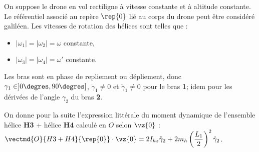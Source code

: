 \begin{hypo}
On suppose le drone en vol rectiligne à vitesse constante et à altitude constante. Le référentiel associé au repère $\rep{0}$ lié au corps du drone peut être considéré galiléen.
Les vitesses de rotation des hélices sont telles que :
\begin{itemize}
\item $|\omega_1|=|\omega_2|=\omega$ constante,
\item $|\omega_3|=|\omega_4|=\omega'$ constante.
\end{itemize}
Les bras sont en phase de repliement ou dépliement, 
donc $\gamma_1 \in ]0\degres, 90\degres]$, 
$\dot{\gamma}_1 \neq 0$ et  $\ddot{\gamma}_1 \neq 0$ pour le bras \textbf{1};
idem pour les dérivées de l’angle $\gamma_2$ du bras \textbf{2}.
\end{hypo}



\ifprof
\begin{corrige}
\end{corrige}
\else
\fi


\ifprof
\begin{corrige}
\end{corrige}
\else
\fi


\ifprof
\begin{corrige}
\end{corrige}
\else
\fi


On donne pour la suite l’expression littérale du moment dynamique de l’ensemble hélice \textbf{H3}
+ hélice \textbf{H4} calculé en $O$ selon $\vz{0}$ : $\vectmd{O}{H3+H4}{\rep{0}} \cdot \vz{0} = 2 I_{hz} \ddot{\gamma}_2 + 2m_h \left(\dfrac{L_1}{2}\right)^2 \ddot{\gamma}_2$.

\ifprof
\begin{corrige}

\end{corrige}
\else
\fi

